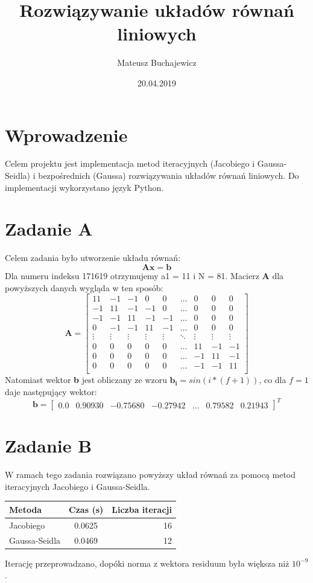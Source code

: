 \documentclass{article} %
\title{Rozwiązywanie układów równań liniowych}
\date{20.04.2019}
\author{Mateusz Buchajewicz}
\begin{document}
\maketitle

\section{Wprowadzenie}
Celem projektu jest implementacja metod iteracyjnych (Jacobiego i Gaussa-Seidla) i
bezpośrednich (Gaussa) rozwiązywania układów równań liniowych. Do implementacji wykorzystano język Python.

\section{Zadanie A}
Celem zadania było utworzenie układu równań:
\begin{equation}
\mathbf{Ax} = \mathbf{b}
\end{equation} 
Dla numeru indeksu 171619 otrzymujemy a1 = 11 i N = 81. \newline
Macierz \textbf{A} dla powyższych danych wygląda w ten sposób: \newline
\[
\textbf{A} = 
\begin{bmatrix}
    11 & -1 & -1 & 0 & 0 &\dots & 0 & 0 & 0 \\
    -1 & 11 & -1 & -1 & 0 & \dots & 0 & 0 & 0\\
    -1 & -1 & 11 & -1 & -1 & \dots & 0 & 0 & 0 \\
    0 & -1 & -1 & 11 & -1 & \dots & 0 & 0 & 0 \\
    \vdots & \vdots & \vdots & \vdots & \vdots & \ddots & \vdots & \vdots & \vdots \\
    0 & 0 & 0 & 0 & 0 & \dots & 11 & -1 & -1 \\
    0 & 0 & 0 & 0 & 0 & \dots & -1 & 11 & -1 \\
    0 & 0 & 0 & 0 & 0 & \dots & -1 & -1 & 11 \\
\end{bmatrix}
\]
Natomiast wektor \textbf{b} jest obliczany ze wzoru \( \mathbf{b_{i}} = sin(i*(f+1))\), co dla \(f = 1\) daje następujący wektor:
\[
    \textbf{b} = 
\begin{bmatrix}
    0.0 & 0.90930 & -0.75680 & -0.27942 & \dots & 0.79582 & 0.21943
\end{bmatrix}^T
\]
\section{Zadanie B}
W ramach tego zadania rozwiązano powyższy układ równań za pomocą metod iteracyjnych Jacobiego i Gaussa-Seidla. \\
\begin{center} 
    \begin{tabular}  { | l | c | r |   }
        \hline
        Metoda & Czas (s) & Liczba iteracji  \\
        \hline
        Jacobiego & 0.0625 & 16 \\
        \hline
        Gaussa-Seidla & 0.0469 & 12 \\
        \hline
    \end{tabular}
\end{center}
Iterację przeprowadzano, dopóki norma z wektora residuum była większa niż \(10^{-9}\).
\newpage
\end{document}
